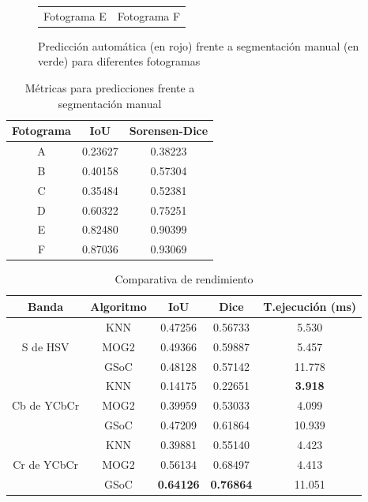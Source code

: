\begin{figure}[h!]
\begin{tabular}{cc}
          \\Fotograma E & Fotograma F
     \end{tabular}
     \caption{Predicción automática (en rojo) frente a segmentación manual (en verde) para diferentes fotogramas}
     \label{fig:iouvisualimgs}
\end{figure}

\begin{table}[h!]
    \centering
    \begin{tabular}{| c | c | c | } \hline
        Fotograma & IoU & Sorensen-Dice \\ \hline
        A & 0.23627 & 0.38223  \\
        B & 0.40158 & 0.57304 \\   
        C & 0.35484 & 0.52381 \\ 
        D & 0.60322 & 0.75251 \\ 
        E & 0.82480 & 0.90399 \\ 
        F & 0.87036 & 0.93069 \\ \hline
    \end{tabular}
    \caption{Métricas para predicciones frente a segmentación manual}
    \label{tab:iouvisualtab}
\end{table}


\begin{table}
    \centering
    \begin{tabular}{| c | c | c | c | c|}\hline
        Banda & Algoritmo & IoU & Dice & T.ejecución (ms) \\ \hline
        \multirow{3}{*}{S de HSV} & KNN  & 0.47256 & 0.56733 & 5.530 \\
        &MOG2 & 0.49366 & 0.59887 & 5.457 \\
        &GSoC & 0.48128 & 0.57142 & 11.778 \\ \hline
        \multirow{3}{*}{Cb de YCbCr} & KNN  & 0.14175 & 0.22651 & \textbf{3.918} \\
        &MOG2 & 0.39959 & 0.53033 & 4.099 \\
        &GSoC & 0.47209 & 0.61864 & 10.939 \\ \hline
        \multirow{3}{*}{Cr de YCbCr} & KNN  & 0.39881 & 0.55140 & 4.423 \\
        &MOG2 & 0.56134 & 0.68497 & 4.413 \\
        &GSoC & \textbf{0.64126} & \textbf{0.76864} & 11.051 \\ \hline
    \end{tabular}
    \caption{Comparativa de rendimiento}
    \label{tab:rendimientofondoscap3}
\end{table}

